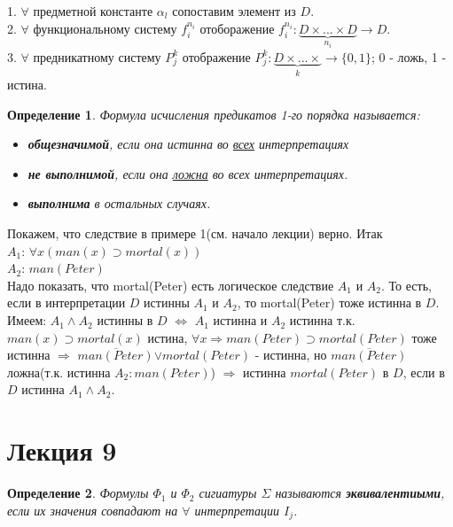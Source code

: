 \documentclass{article}
\newtheorem{definition}{Определение}
\numberwithin{example}{section}
\numberwithin{question}{section}
\numberwithin{Remark}{section}
\numberwithin{theorem}{section}
\numberwithin{definition}{section}
\numberwithin{proposition}{section}
\begin{document}
	1. $\forall$ предметной константе $\alpha_{l}$ сопоставим элемент из $D$.\\
	2. $\forall$ функциональному систему $f_i^{n_i}$ отоборажение $f_i^{n_i}: \underbrace{D\times ...\times D}_{n_i}\to D$.\\ 
	3. $\forall$ предникатному систему $P_j^{k}$ отображение $P_j^{k}:\underbrace{D\times ... \times}_{k}\to \{0,1\}$; 0 - ложь, 1 - истина.
	\begin{definition}
Формула исчисления предикатов 1-го порядка называется:
	\begin{itemize}
		\item \textbf{общезначимой}, если она истинна во \underline{всех} интерпретациях
		\item \textbf{не выполнимой}, если она \underline{ложна} во всех интерпретациях.
		\item \textbf{выполнима} в остальных случаях.
	\end{itemize}
	\end{definition}
	
	Покажем, что следствие в примере 1(см. начало лекции) верно. Итак\\
	$A_1$: $\forall x (man(x)\supset mortal(x))$\\
	$A_2$: $man(Peter)$\\
	Надо показать, что mortal(Peter) есть логическое следствие $A_1$ и $A_2$. То есть, если в интерпретации $D$ истинны $A_1$ и $A_2$, то mortal(Peter) тоже истинна в $D$.\\
	Имеем: $A_1\land A_2$ истинны в $D$ $\Leftrightarrow$ $A_1$ истинна и $A_2$ истинна т.к. $man(x)\supset mortal(x)$ истина, $\forall x\Rightarrow man(Peter)\supset mortal(Peter)$ тоже истинна $\Rightarrow$ $\overline{man(Peter)}$$\lor mortal(Peter)$ - истинна, но $\overline{man(Peter)}$ ложна(т.к. истинна $A_2: man(Peter)$) $\Rightarrow$ истинна $mortal(Peter)$ в $D$, если в $D$ истинна $A_1\land A_2$.
	
\section{Лекция 9}
\begin{definition}
	Формулы $\Phi_1$ и $\Phi_2$ сигиатуры $\Sigma$ называются \textbf{эквивалентиыми}, если их значения совпадают на $\forall$ интерпретации $I_j$.
\end{definition}
	
\end{document}
